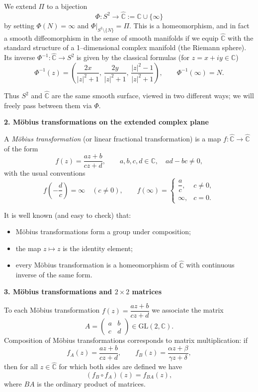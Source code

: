 \begin{solution}
	We extend $\Pi$ to a bijection
	\[
	\Phi : S^{2} \longrightarrow \widehat{\mathbb{C}} := \mathbb{C}\cup\{\infty\}
	\]
	by setting $\Phi(N) = \infty$ and $\Phi|_{S^{2}\setminus\{N\}} = \Pi$.
	This is a homeomorphism, and in fact a smooth diffeomorphism in the sense
	of smooth manifolds if we equip $\widehat{\mathbb{C}}$ with the standard
	structure of a 1--dimensional complex manifold (the Riemann sphere).  Its
	inverse $\Phi^{-1}:\widehat{\mathbb{C}}\to S^{2}$ is given by the classical
	formulas (for $z=x+iy\in\mathbb{C}$)
	\[
	\Phi^{-1}(z) =
	\left(
	\frac{2x}{|z|^{2}+1},\,
	\frac{2y}{|z|^{2}+1},\,
	\frac{|z|^{2}-1}{|z|^{2}+1}
	\right),
	\qquad
	\Phi^{-1}(\infty) = N.
	\]
	
	Thus $S^{2}$ and $\widehat{\mathbb{C}}$ are the same smooth surface, viewed
	in two different ways; we will freely pass between them via $\Phi$.
	
	\par\medskip\noindent\textbf{2. M\"{o}bius transformations on the extended complex plane}\par\smallskip

	
	A \emph{M\"{o}bius transformation} (or linear fractional transformation) is a
	map $f:\widehat{\mathbb{C}}\to\widehat{\mathbb{C}}$ of the form
	\[
	f(z) = \frac{az+b}{cz+d},
	\qquad a,b,c,d\in\mathbb{C},\quad ad-bc\neq 0,
	\]
	with the usual conventions
	\[
	f\!\left(-\frac{d}{c}\right) = \infty\quad (c\neq 0),\qquad
	f(\infty) =
	\begin{cases}
		\dfrac{a}{c}, & c\neq 0,\\[0.4em]
		\infty, & c=0.
	\end{cases}
	\]
	
	It is well known (and easy to check) that:
	
	\begin{itemize}
		\item M\"{o}bius transformations form a group under composition;
		\item the map $z\mapsto z$ is the identity element;
		\item every M\"{o}bius transformation is a homeomorphism of
		$\widehat{\mathbb{C}}$ with continuous inverse of the same form.
	\end{itemize}
	
	\par\medskip\noindent\textbf{3. M\"{o}bius transformations and $2\times 2$ matrices}\par\smallskip

	
	To each M\"{o}bius transformation $f(z)=\dfrac{az+b}{cz+d}$ we associate the
	matrix
	\[
	A =
	\begin{pmatrix}
		a & b\\
		c & d
	\end{pmatrix}
	\in \mathrm{GL}(2,\mathbb{C}).
	\]
	Composition of M\"{o}bius transformations corresponds to matrix multiplication:
	if
	\[
	f_A(z) = \frac{az+b}{cz+d},\qquad
	f_B(z) = \frac{\alpha z+\beta}{\gamma z+\delta},
	\]
	then for all $z\in\widehat{\mathbb{C}}$ for which both sides are defined we
	have
	\[
	(f_B\circ f_A)(z) = f_{BA}(z),
	\]
	where $BA$ is the ordinary product of matrices.
	

\end{solution}
